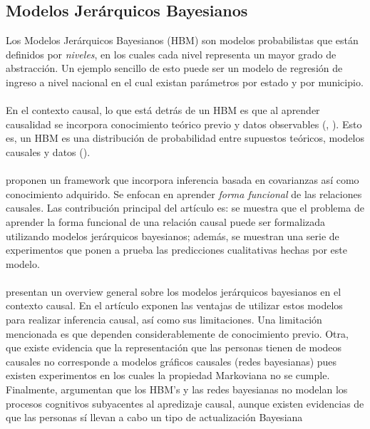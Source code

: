 \documentclass[11pt]{article}
\theoremstyle{plain}
\begin{document}
\subsection{Modelos Jerárquicos Bayesianos}
Los Modelos Jerárquicos Bayesianos (HBM) son modelos probabilistas que están definidos por \textit{niveles}, en los cuales cada nivel representa un mayor grado de abstracción. Un ejemplo sencillo de esto puede ser un modelo de regresión de ingreso a nivel nacional en el cual existan parámetros por estado y por municipio.\\
\\
En el contexto causal, lo que está detrás de un HBM es que al aprender causalidad se incorpora conocimiento teórico previo y datos observables (\cite{griffiths2005structure}, \cite{griffiths2009theory}). Esto es, un HBM es una distribución de probabilidad entre supuestos teóricos, modelos causales y datos (\cite{hagmayer2013hierarchical}).\\
\\
\cite{lucas2010learning} proponen un framework que incorpora inferencia basada en covarianzas así como conocimiento adquirido. Se enfocan en aprender  \textit{forma funcional} de las relaciones causales. Las contribución principal del artículo es: se muestra que el problema de aprender la forma funcional de una relación causal puede ser formalizada utilizando modelos jerárquicos bayesianos; además, se muestran una serie de experimentos que ponen a prueba las predicciones cualitativas hechas por este modelo.\\
\\
\cite{hagmayer2013hierarchical} presentan un overview general sobre los modelos jerárquicos bayesianos en el contexto causal. En el artículo exponen las ventajas de utilizar estos modelos para realizar inferencia causal, así como sus limitaciones. Una limitación mencionada es que dependen considerablemente de conocimiento previo. Otra, que existe evidencia que la representación que las personas tienen de modeos causales no corresponde a modelos gráficos causales (redes bayesianas) pues existen experimentos en los cuales la propiedad Markoviana no se cumple. Finalmente, argumentan que los HBM's y las redes bayesianas no modelan los procesos cognitivos subyacentes al apredizaje causal, aunque existen evidencias de que las personas sí llevan a cabo un tipo de actualización Bayesiana
\end{document}
